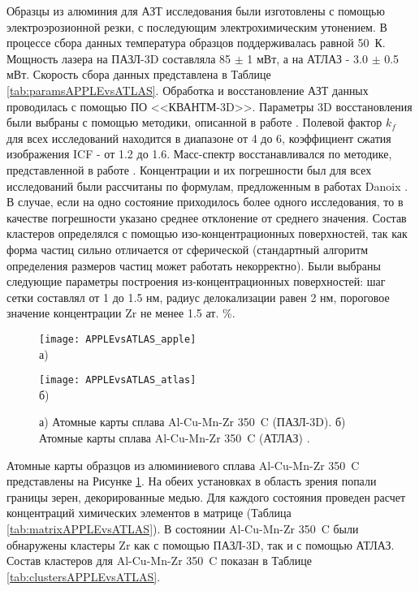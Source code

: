 Образцы из алюминия для АЗТ исследования были изготовлены с помощью электроэрозионной резки, с последующим электрохимическим утонением. В процессе сбора данных температура образцов поддерживалась равной 50~К. Мощность лазера на  ПАЗЛ-3D составляла 85 $\pm$ 1 мВт, а на АТЛАЗ - 3.0 $\pm$ 0.5 мВт. Скорость сбора данных представлена в Таблице \cref{tab:paramsAPPLEvsATLAS}. Обработка и восстановление АЗТ данных проводилась с помощью ПО <<КВАНТМ-3D>>. Параметры 3D восстановления были выбраны с помощью методики, описанной в работе \cite{scbibDensity}. Полевой фактор $k_f$ для всех исследований находится в диапазоне от 4 до 6, коэффициент сжатия изображения ICF  - от 1.2 до 1.6. Масс-спектр восстанавливался по методике, представленной в работе \cite{Shutov19}. Концентрации и их погрешности был для всех исследований были рассчитаны по формулам, предложенным в работах Danoix \cite{Danoix071,Danoix072}. В случае, если на одно состояние приходилось более одного исследования, то в качестве погрешности указано среднее отклонение от среднего значения. Состав кластеров определялся с помощью изо-концентрационных поверхностей, так как форма частиц сильно отличается от сферической (стандартный алгоритм определения размеров частиц может работать некорректно). Были выбраны следующие параметры построения из-концентрационных поверхностей: шаг сетки составлял от 1 до 1.5 нм, радиус делокализации равен 2 нм, пороговое значение концентрации Zr не менее 1.5 ат. \%.

\begin{figure}[h!tb]
	\begin{minipage}[b][][b]{0.49\textwidth}\centering
		\texttt{[image: APPLEvsATLAS\_apple]} \\ а)
	\end{minipage}
	\begin{minipage}[b][][b]{0.49\textwidth}\centering
		\texttt{[image: APPLEvsATLAS\_atlas]} \\ б)
	\end{minipage}
	\caption{а) Атомные карты сплава Al-Cu-Mn-Zr 350~\textdegree C (ПАЗЛ-3D). б) Атомные карты сплава Al-Cu-Mn-Zr 350~\textdegree C (АТЛАЗ) \cite{scbibAPPLEvsATLAS}.}
	\label{fig:APPLEvsATLAS}
\end{figure} 

Атомные карты образцов из алюминиевого сплава Al-Cu-Mn-Zr 350~\textdegree C представлены на Рисунке \cref{fig:APPLEvsATLAS}. На обеих установках в область зрения попали границы зерен, декорированные медью. Для каждого состояния проведен расчет концентраций химических элементов в матрице (Таблица \cref{tab:matrixAPPLEvsATLAS}). В состоянии Al-Cu-Mn-Zr 350~\textdegree C были обнаружены кластеры Zr как с помощью ПАЗЛ-3D, так и с помощью АТЛАЗ. Состав кластеров для Al-Cu-Mn-Zr 350~\textdegree C показан в Таблице \cref{tab:clustersAPPLEvsATLAS}. 

